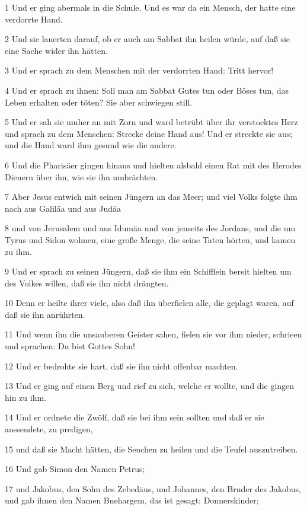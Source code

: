 \par 1 Und er ging abermals in die Schule. Und es war da ein Mensch, der hatte eine verdorrte Hand.
\par 2 Und sie lauerten darauf, ob er auch am Sabbat ihn heilen würde, auf daß sie eine Sache wider ihn hätten.
\par 3 Und er sprach zu dem Menschen mit der verdorrten Hand: Tritt hervor!
\par 4 Und er sprach zu ihnen: Soll man am Sabbat Gutes tun oder Böses tun, das Leben erhalten oder töten? Sie aber schwiegen still.
\par 5 Und er sah sie umher an mit Zorn und ward betrübt über ihr verstocktes Herz und sprach zu dem Menschen: Strecke deine Hand aus! Und er streckte sie aus; und die Hand ward ihm gesund wie die andere.
\par 6 Und die Pharisäer gingen hinaus und hielten alsbald einen Rat mit des Herodes Dienern über ihn, wie sie ihn umbrächten.
\par 7 Aber Jesus entwich mit seinen Jüngern an das Meer; und viel Volks folgte ihm nach aus Galiläa und aus Judäa
\par 8 und von Jerusalem und aus Idumäa und von jenseits des Jordans, und die um Tyrus und Sidon wohnen, eine große Menge, die seine Taten hörten, und kamen zu ihm.
\par 9 Und er sprach zu seinen Jüngern, daß sie ihm ein Schifflein bereit hielten um des Volkes willen, daß sie ihn nicht drängten.
\par 10 Denn er heilte ihrer viele, also daß ihn überfielen alle, die geplagt waren, auf daß sie ihn anrührten.
\par 11 Und wenn ihn die unsauberen Geister sahen, fielen sie vor ihm nieder, schrieen und sprachen: Du bist Gottes Sohn!
\par 12 Und er bedrohte sie hart, daß sie ihn nicht offenbar machten.
\par 13 Und er ging auf einen Berg und rief zu sich, welche er wollte, und die gingen hin zu ihm.
\par 14 Und er ordnete die Zwölf, daß sie bei ihm sein sollten und daß er sie aussendete, zu predigen,
\par 15 und daß sie Macht hätten, die Seuchen zu heilen und die Teufel auszutreiben.
\par 16 Und gab Simon den Namen Petrus;
\par 17 und Jakobus, den Sohn des Zebedäus, und Johannes, den Bruder des Jakobus, und gab ihnen den Namen Bnehargem, das ist gesagt: Donnerskinder;

